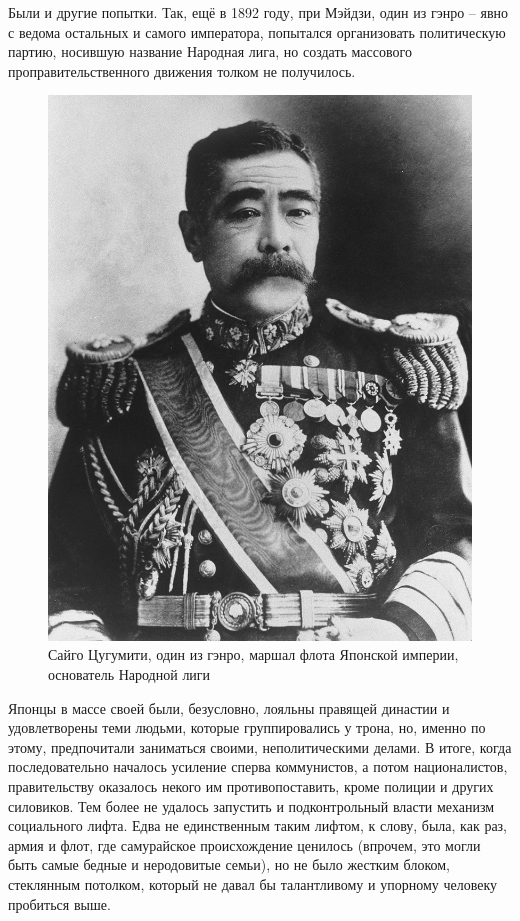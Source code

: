 Были и другие попытки. Так, ещё в 1892 году, при Мэйдзи, один из гэнро – явно с ведома остальных и самого императора, попытался организовать политическую партию, носившую название Народная лига, но создать массового проправительственного движения толком не получилось. 

\begin{figure}[h!tb] 
	\centering\includegraphics[scale=0.5]{Glava2/oX2fBPYepVY.jpg}
	\caption{Сайго Цугумити, один из гэнро, маршал флота Японской империи, основатель Народной лиги}%
\end{figure}

Японцы в массе своей были, безусловно, лояльны правящей династии и удовлетворены теми людьми, которые группировались у трона, но, именно по этому, предпочитали заниматься своими, неполитическими делами. В итоге, когда последовательно началось усиление сперва коммунистов, а потом националистов, правительству оказалось некого им противопоставить, кроме полиции и других силовиков. Тем более не удалось запустить и подконтрольный власти механизм социального лифта. Едва не единственным таким лифтом, к слову, была, как раз, армия и флот, где самурайское происхождение ценилось (впрочем, это могли быть самые бедные и неродовитые семьи), но не было жестким блоком, стеклянным потолком, который не давал бы талантливому и упорному человеку пробиться выше.

